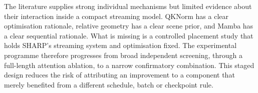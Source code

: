 The literature supplies strong individual mechanisms but limited evidence about their interaction inside a compact streaming model. QKNorm has a clear optimisation rationale, relative geometry has a clear scene prior, and Mamba has a clear sequential rationale. What is missing is a controlled placement study that holds SHARP's streaming system and optimisation fixed. The experimental programme therefore progresses from broad independent screening, through a full-length attention ablation, to a narrow confirmatory combination. This staged design reduces the risk of attributing an improvement to a component that merely benefited from a different schedule, batch or checkpoint rule.
